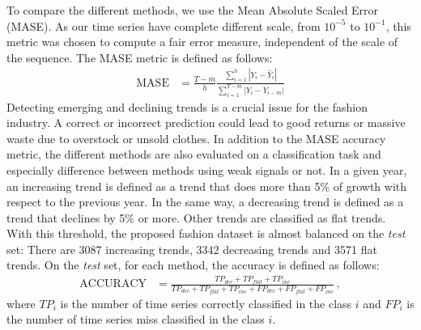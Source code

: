 \documentclass{article} %
\newcommand{\lag}{h}
\begin{document}
To compare the different methods, we use the Mean Absolute Scaled Error (MASE). As our time series have complete different scale, from $10^{-5}$ to $10^{-1}$, this metric was chosen to compute a fair error measure, independent of the scale of the sequence. The MASE metric is defined as follows:
\begin{align*}
\mathrm{MASE} &= \frac{T-m}{h}\frac{\sum_{i=1}^h |Y_i - \hat{Y}_i| }{\sum_{i=1}^{T-m} |Y_i - Y_{i-m}|}
\end{align*}
%
Detecting emerging and declining trends is a crucial issue for the fashion industry. A correct or incorrect prediction could lead to good returns or massive waste due to overstock or unsold clothes. In addition to the MASE accuracy metric, the different methods are also evaluated on a classification task and especially difference between methods using weak signals or not. In a given year, an increasing trend is defined as a trend that does more than 5\% of growth with respect to the previous year. In the same way, a decreasing trend is defined as a trend that declines by 5\% or more. Other trends are classified as flat trends. With this threshold, the proposed fashion dataset is almost balanced on the {\em test} set: There are 3087 increasing trends, 3342 decreasing trends and 3571 flat trends. On the {\em test} set, for each method, the accuracy is defined as follows:
\begin{align*}
\mathrm{ACCURACY} &= \frac{TP_{dec} + TP_{flat} + TP_{inc}}{TP_{dec} + TP_{flat} + TP_{inc} + FP_{dec} + FP_{flat} + FP_{inc}}\,,
\end{align*}
where $TP_i$ is the number of time series correctly classified in the class $i$ and $FP_i$ is the number of time series miss classified in the class $i$.
\end{document}
